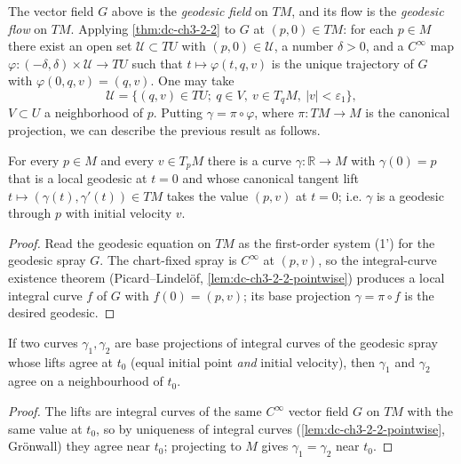 \begin{definition}
  \label{def:dc-ch3-2-4}
  \leanok
  The vector field $G$ above is the \emph{geodesic field} on $TM$, and its flow is the
  \emph{geodesic flow} on $TM$. Applying \cref{thm:dc-ch3-2-2} to $G$ at $(p,0)\in TM$: for each
  $p\in M$ there exist an open set $\mathcal{U}\subset TU$ with $(p,0)\in\mathcal{U}$,
  a number $\delta>0$, and a $C^\infty$ map $\varphi:(-\delta,\delta)\times\mathcal{U}\to TU$
  such that $t\mapsto\varphi(t,q,v)$ is the unique trajectory of $G$ with
  $\varphi(0,q,v)=(q,v)$. One may take
  $$
  \mathcal{U}=\{(q,v)\in TU;\ q\in V,\ v\in T_qM,\ |v|<\varepsilon_1\},
  $$
  $V\subset U$ a neighborhood of $p$. Putting $\gamma=\pi\circ\varphi$, where
  $\pi:TM\to M$ is the canonical projection, we can describe the previous result as
  follows.
\end{definition}

\begin{lemma}
  \label{lem:dc-ch3-2-5-exist}
  \leanok
  For every $p\in M$ and every $v\in T_pM$ there is a curve $\gamma:\mathbb{R}\to M$
  with $\gamma(0)=p$ that is a local geodesic at $t=0$ and whose canonical tangent
  lift $t\mapsto(\gamma(t),\gamma'(t))\in TM$ takes the value $(p,v)$ at $t=0$; i.e.
  $\gamma$ is a geodesic through $p$ with initial velocity $v$.
\end{lemma}
\begin{proof}
  \sketch
  \leanok
  Read the geodesic equation on $TM$ as the first-order system (1') for the
  geodesic spray $G$. The chart-fixed spray is $C^\infty$ at $(p,v)$, so the
  integral-curve existence theorem (Picard--Lindel\"of,
  \cref{lem:dc-ch3-2-2-pointwise}) produces a local integral curve $f$ of $G$ with
  $f(0)=(p,v)$; its base projection $\gamma=\pi\circ f$ is the desired geodesic.
\end{proof}

\begin{lemma}
  \label{lem:dc-ch3-2-5-unique}
  \leanok
  If two curves $\gamma_1,\gamma_2$ are base projections of integral curves of the
  geodesic spray whose lifts agree at $t_0$ (equal initial point \emph{and} initial
  velocity), then $\gamma_1$ and $\gamma_2$ agree on a neighbourhood of $t_0$.
\end{lemma}
\begin{proof}
  \sketch
  \leanok
  The lifts are integral curves of the same $C^\infty$ vector field $G$ on $TM$
  with the same value at $t_0$, so by uniqueness of integral curves
  (\cref{lem:dc-ch3-2-2-pointwise}, Gr\"onwall) they agree near $t_0$; projecting to $M$
  gives $\gamma_1=\gamma_2$ near $t_0$.
\end{proof}

